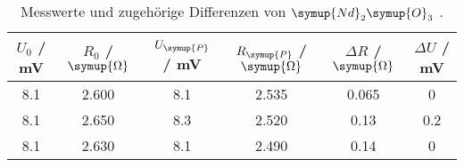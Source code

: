 \begin{table}[!htp]
\centering
\caption{Messwerte und zugehörige Differenzen von $\symup{Nd}_2\symup{O}_3$ .}
\label{tab:Nd2O3}
\begin{tabular}{c c c c c c}
\toprule
{$U_0$ / mV} & {$R_0$ / $\symup{\Omega}$} & {$U_{\symup{P}}$ / mV} & {$R_{\symup{P}}$ / $\symup{\Omega}$} & {$\Delta R$ / $\symup{\Omega}$} & {$\Delta U$ / mV}\\
\midrule
8.1 & 2.600 & 8.1 & 2.535 & 0.065 & 0 \\
8.1 & 2.650 & 8.3 & 2.520 & 0.13 & 0.2 \\
8.1 & 2.630 & 8.1 & 2.490 & 0.14 & 0 \\
\bottomrule
\end{tabular}
\end{table}